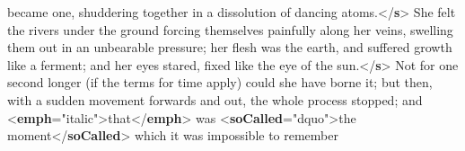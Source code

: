 \begin{shaded}
\hspace*{1em}\hspace*{1em} became one, shuddering together in a dissolution of dancing\mbox{}\newline 
\hspace*{1em}\hspace*{1em} atoms.{</\textbf{s}>}\mbox{}\newline 
{}She felt the rivers under the ground forcing\mbox{}\newline 
\hspace*{1em}\hspace*{1em} themselves painfully along her veins, swelling them out in an\mbox{}\newline 
\hspace*{1em}\hspace*{1em} unbearable pressure; her flesh was the earth, and suffered growth\mbox{}\newline 
\hspace*{1em}\hspace*{1em} like a ferment; and her eyes stared, fixed like the eye of the\mbox{}\newline 
\hspace*{1em}\hspace*{1em} sun.{</\textbf{s}>}\mbox{}\newline 
{}Not for one second longer (if the terms for time\mbox{}\newline 
\hspace*{1em}\hspace*{1em} apply) could she have borne it; but then, with a sudden movement\mbox{}\newline 
\hspace*{1em}\hspace*{1em} forwards and out, the whole process stopped; and {<\textbf{emph}\hspace*{1em}{rend}="{italic}">}that{</\textbf{emph}>} was {<\textbf{soCalled}\hspace*{1em}{rend}="{dquo}">}the\mbox{}\newline 
\hspace*{1em}\hspace*{1em}\hspace*{1em}\hspace*{1em} moment{</\textbf{soCalled}>} which it was impossible to remember\mbox{}\newline 

\end{shaded}

